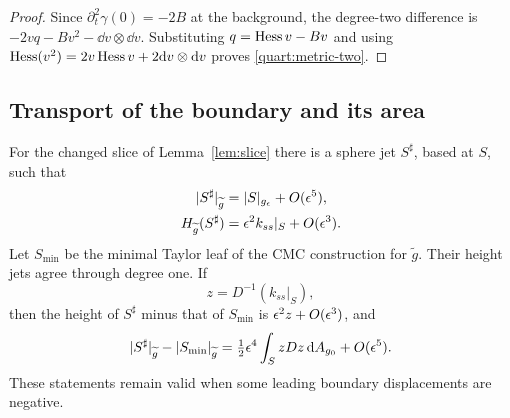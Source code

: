 \begin{proof}
Since \(\partial_t^2\gamma(0)=-2B\) at the background, the
degree-two difference is
\(-2vq-Bv^2-\dd v\otimes\dd v\).  Substituting
\(q=\operatorname{Hess} v-Bv\) and using
\(\operatorname{Hess}(v^2)=2v\operatorname{Hess} v+2\mathrm{d} v\otimes\mathrm{d} v\) proves
\eqref{quart:metric-two}.
\end{proof}

\subsection{Transport of the boundary and its area}

\begin{lemma}
\label{lem:null-cut}
For the changed slice of Lemma~\ref{lem:slice} there is a sphere jet
\(S^\sharp\), based at \(S\), such that
\begin{align}
 |S^\sharp|_{\widetilde g}&=|S|_{g_\epsilon}+O(\epsilon^5),
 \label{quart:null-area}\\
 H_{\widetilde g}(S^\sharp)
      &=\epsilon^2k_{ss}|_S+O(\epsilon^3).
 \label{quart:null-h}
\end{align}
Let \(S_{\min}\) be the minimal Taylor leaf of the CMC construction
for \(\widetilde g\).  Their height jets agree through degree one.  If
\begin{equation}
 z=D^{-1}(k_{ss}|_S),
 \label{quart:z}
\end{equation}
then the height of \(S^\sharp\) minus that of \(S_{\min}\) is
\(\epsilon^2z+O(\epsilon^3)\), and
\begin{equation}
 |S^\sharp|_{\widetilde g}-|S_{\min}|_{\widetilde g}
     =\tfrac12\epsilon^4\int_S zDz\,\mathrm{d} A_{g_0}+O(\epsilon^5).
 \label{quart:area-hessian}
\end{equation}
These statements remain valid when some leading boundary
displacements are negative.
\end{lemma}

